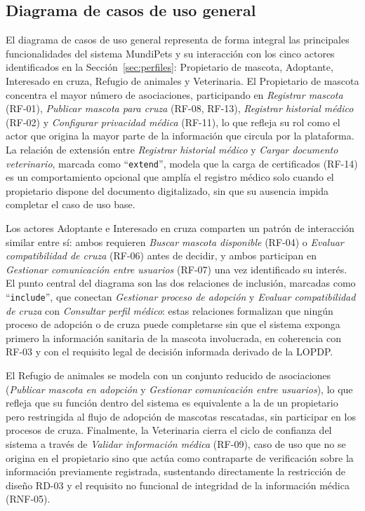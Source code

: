 \documentclass[journal,onecolumn]{IEEEtran}
\begin{document}
	\subsection{Diagrama de casos de uso general}
	\label{sec:cu-general}
	
	El diagrama de casos de uso general representa de forma integral las
	principales funcionalidades del sistema MundiPets y su interacción con los
	cinco actores identificados en la Sección~\ref{sec:perfiles}: Propietario de
	mascota, Adoptante, Interesado en cruza, Refugio de animales y Veterinaria.
	El Propietario de mascota concentra el mayor número de asociaciones,
	participando en \emph{Registrar mascota} (RF-01), \emph{Publicar mascota
		para cruza} (RF-08, RF-13), \emph{Registrar historial médico} (RF-02) y
	\emph{Configurar privacidad médica} (RF-11), lo que refleja su rol como el
	actor que origina la mayor parte de la información que circula por la
	plataforma. La relación de extensión entre \emph{Registrar historial médico}
	y \emph{Cargar documento veterinario}, marcada como
	\enquote{\texttt{extend}}, modela que la carga de certificados (RF-14) es un
	comportamiento opcional que amplía el registro médico solo cuando el
	propietario dispone del documento digitalizado, sin que su ausencia impida
	completar el caso de uso base.
	
	Los actores Adoptante e Interesado en cruza comparten un patrón de
	interacción similar entre sí: ambos requieren \emph{Buscar mascota
		disponible} (RF-04) o \emph{Evaluar compatibilidad de cruza} (RF-06) antes
	de decidir, y ambos participan en \emph{Gestionar comunicación entre
		usuarios} (RF-07) una vez identificado su interés. El punto central del
	diagrama son las dos relaciones de inclusión, marcadas como
	\enquote{\texttt{include}}, que conectan \emph{Gestionar proceso de
		adopción} y \emph{Evaluar compatibilidad de cruza} con \emph{Consultar
		perfil médico}: estas relaciones formalizan que ningún proceso de adopción
	o de cruza puede completarse sin que el sistema exponga primero la
	información sanitaria de la mascota involucrada, en coherencia con RF-03 y
	con el requisito legal de decisión informada derivado de la LOPDP.
	
	El Refugio de animales se modela con un conjunto reducido de asociaciones
	(\emph{Publicar mascota en adopción} y \emph{Gestionar comunicación entre
		usuarios}), lo que refleja que su función dentro del sistema es equivalente
	a la de un propietario pero restringida al flujo de adopción de mascotas
	rescatadas, sin participar en los procesos de cruza. Finalmente, la
	Veterinaria cierra el ciclo de confianza del sistema a través de
	\emph{Validar información médica} (RF-09), caso de uso que no se origina en
	el propietario sino que actúa como contraparte de verificación sobre la
	información previamente registrada, sustentando directamente la restricción
	de diseño RD-03 y el requisito no funcional de integridad de la información
	médica (RNF-05).
	
\end{document}
